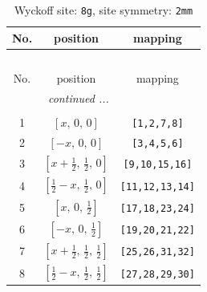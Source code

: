 \documentclass[fleqn,8pt]{jsarticle}
\begin{document}
\begin{longtable}{ccc}
\caption{Wyckoff site: {\tt 8g}, site symmetry: {\tt 2mm}}
 \\
 \hline \hline
No. & position & mapping \\ \hline \endfirsthead

\multicolumn{2}{l}{\tablename\ \thetable{}} \\
 \hline \hline
No. & position & mapping \\ \hline \endhead

 \hline \hline
\multicolumn{2}{r}{\footnotesize\it continued ...} \\ \endfoot

 \hline \hline
\multicolumn{2}{r}{} \\ \endlastfoot

1 & $\left[ x,\, 0,\, 0 \right]$ & {\tt [1,2,7,8]} \\ \hline
2 & $\left[ - x,\, 0,\, 0 \right]$ & {\tt [3,4,5,6]} \\ \hline
3 & $\left[ x + \frac{1}{2},\, \frac{1}{2},\, 0 \right]$ & {\tt [9,10,15,16]} \\ \hline
4 & $\left[ \frac{1}{2} - x,\, \frac{1}{2},\, 0 \right]$ & {\tt [11,12,13,14]} \\ \hline
5 & $\left[ x,\, 0,\, \frac{1}{2} \right]$ & {\tt [17,18,23,24]} \\ \hline
6 & $\left[ - x,\, 0,\, \frac{1}{2} \right]$ & {\tt [19,20,21,22]} \\ \hline
7 & $\left[ x + \frac{1}{2},\, \frac{1}{2},\, \frac{1}{2} \right]$ & {\tt [25,26,31,32]} \\ \hline
8 & $\left[ \frac{1}{2} - x,\, \frac{1}{2},\, \frac{1}{2} \right]$ & {\tt [27,28,29,30]} \\
\end{longtable}
\renewcommand{\arraystretch}{1.2}
\end{document}
